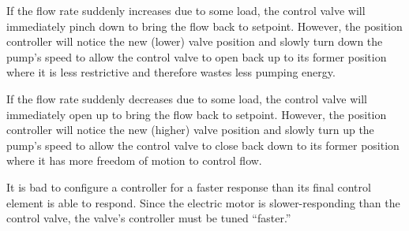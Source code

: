 If the flow rate suddenly increases due to some load, the control valve will immediately pinch down to bring the flow back to setpoint.  However, the position controller will notice the new (lower) valve position and slowly turn down the pump's speed to allow the control valve to open back up to its former position where it is less restrictive and therefore wastes less pumping energy.

\vskip 10pt

If the flow rate suddenly decreases due to some load, the control valve will immediately open up to bring the flow back to setpoint.  However, the position controller will notice the new (higher) valve position and slowly turn up the pump's speed to allow the control valve to close back down to its former position where it has more freedom of motion to control flow.

\vskip 10pt

It is bad to configure a controller for a faster response than its final control element is able to respond.  Since the electric motor is slower-responding than the control valve, the valve's controller must be tuned ``faster.''











